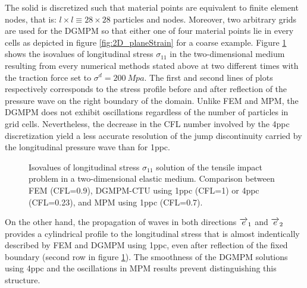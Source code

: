 The solid is discretized such that material points are equivalent to finite element nodes, that is: $l\times l \equiv 28 \times 28$ particles and nodes. Moreover, two arbitrary grids are used for the DGMPM so that either one of four material points lie in every cells as depicted in figure \ref{fig:2D_planeStrain} for a coarse example.
Figure \ref{fig:2delast_comparison} shows the isovalues of longitudinal stress $\sigma_{11}$ in the two-dimensional medium resulting from every numerical methods stated above at two different times with the traction force set to $\sigma^d=200\: Mpa$. The first and second lines of plots respectively corresponds to the stress profile before and after reflection of the pressure wave on the right boundary of the domain.
Unlike FEM and MPM, the DGMPM does not exhibit oscillations regardless of the number of particles in grid cells. Nevertheless, the decrease in the CFL number involved by the 4ppc discretization yield a less accurate resolution of the jump discontinuity carried by the longitudinal pressure wave than for 1ppc.
\begin{figure}[h!]
  \centering
  
  \caption{Isovalues of longitudinal stress $\sigma_{11}$ solution of the tensile impact problem in a two-dimensional elastic medium. Comparison between FEM (CFL=0.9), DGMPM-CTU using 1ppc (CFL=1) or 4ppc (CFL=0.23), and MPM using 1ppc (CFL=0.7).}
  \label{fig:2delast_comparison}
\end{figure}
On the other hand, the propagation of waves in both directions ${\overrightarrow{e}}_1$ and ${\overrightarrow{e}}_2$ provides a cylindrical profile to the longitudinal stress that is almost indentically described by FEM and DGMPM using 1ppc, even after reflection of the fixed boundary (second row in figure \ref{fig:2delast_comparison}). The smoothness of the DGMPM solutions using 4ppc and the oscillations in MPM results prevent distinguishing this structure.






